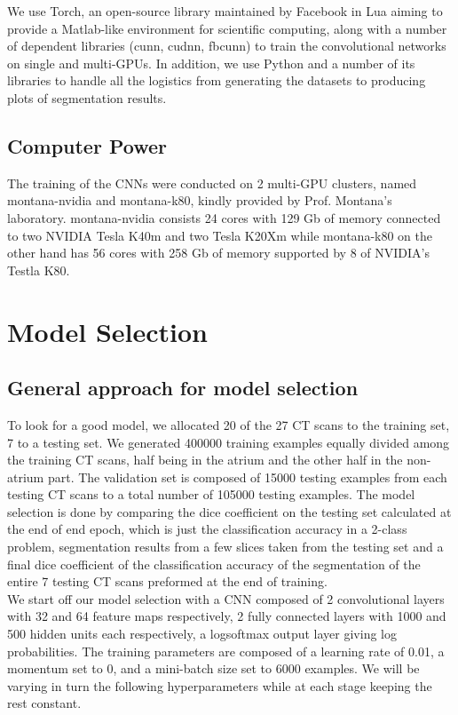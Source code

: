 We use Torch, an open-source library maintained by Facebook in Lua aiming to provide a Matlab-like environment for scientific computing, along with a number of dependent libraries (cunn, cudnn, fbcunn) to train the convolutional networks on single and multi-GPUs. In addition, we use Python and a number of its libraries to handle all the logistics from generating the datasets to producing plots of segmentation results.

\subsection{Computer Power}

The training of the CNNs were conducted on 2 multi-GPU clusters, named montana-nvidia and montana-k80, kindly provided by Prof. Montana's laboratory. montana-nvidia consists 24 cores with 129 Gb of memory connected to two NVIDIA Tesla K40m and two Tesla K20Xm while montana-k80 on the other hand has 56 cores with 258 Gb of memory supported by 8 of NVIDIA's Testla K80. 

\section{Model Selection}

\subsection{General approach for model selection}

To look for a good model, we allocated 20 of the 27 CT scans to the training set, 7 to a testing set. We generated 400000 training examples equally divided among the training CT scans, half being in the atrium and the other half in the non-atrium part. The validation set is composed of 15000 testing examples from each testing CT scans to a total number of 105000 testing examples. The model selection is done by comparing the dice coefficient on the testing set calculated at the end of end epoch, which is just the classification accuracy in a 2-class problem, segmentation results from a few slices taken from the testing set and a final dice coefficient of the classification accuracy of the segmentation of the entire 7 testing CT scans preformed at the end of training.\\

We start off our model selection with a CNN composed of 2 convolutional layers with 32 and 64 feature maps respectively, 2 fully connected layers with 1000 and 500 hidden units each respectively, a logsoftmax output layer giving log probabilities. The training parameters are composed of a learning rate of 0.01, a momentum set to 0, and a mini-batch size set to 6000 examples. We will be varying in turn the following hyperparameters while at each stage keeping the rest constant.\\

